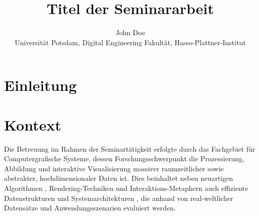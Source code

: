 \documentclass[german]{cgspaper} %
\title{Titel der Seminararbeit}
\author{John Doe\\ Universität Potsdam, Digital Engineering Fakultät, Hasso-Plattner-Institut}
\begin{document}

\maketitle

\begin{abstract}
\end{abstract}

\copyrightspace %

\section{Einleitung}


\section{Kontext}
\label{sec:Kontext}
Die Betreuung im Rahmen der Seminartätigkeit erfolgte durch das Fachgebiet für Computergrafische Systeme, dessen Forschungsschwerpunkt die Prozessierung, Abbildung und interaktive Visualisierung massiver raumzeitlicher \cite{Oehlke2015,Buschmann2015,Buschmann2014,Maass2006} sowie abstrakter, hochdimensionaler Daten \cite{Limberger2017,Limberger2016,Wuerfel2015} ist. Dies beinhaltet neben neuartigen Algorithmen \cite{RichterKyprianidis2013,RichterBehrens2013,Glander2012}, Rendering-Techniken \cite{Semmo2016,Pasewaldt2014,Maass2006a,Doellner2005} und Interaktions-Metaphern \cite{Semmo2016a,Scheibel2016,Semmo2014} auch effiziente Datenstrukturen \cite{Scheibel2017,Richter2015} und Systemarchitekturen \cite{Klimke2014,Trapp2012,Klimke2010}, die anhand von real-weltlicher Datensätze und Anwendungsszenarien  \cite{Discher2016,Trapp2015,Engel2012} evaluiert werden. 
\end{document}
